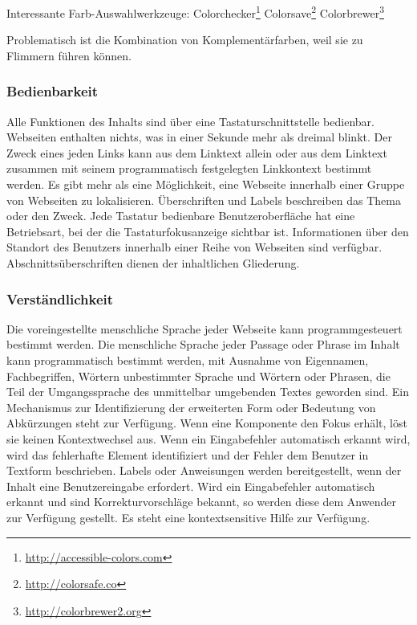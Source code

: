 Interessante Farb-Auswahlwerkzeuge:
Colorchecker\footnote{ \url{http://accessible-colors.com}} 
Colorsave\footnote{ \url{http://colorsafe.co}} 
Colorbrewer\footnote{ \url{http://colorbrewer2.org}} 


Problematisch ist die Kombination von Komplementärfarben, weil sie zu Flimmern führen können.~\cite{HellbuschJanEric2011Bvuu}

\subsubsection*{Bedienbarkeit}
Alle Funktionen des Inhalts sind über eine Tastaturschnittstelle bedienbar.
Webseiten enthalten nichts, was in einer Sekunde mehr als dreimal blinkt.
Der Zweck eines jeden Links kann aus dem Linktext allein oder aus dem Linktext zusammen mit seinem programmatisch festgelegten Linkkontext bestimmt werden. Es gibt mehr als eine Möglichkeit, eine Webseite innerhalb einer Gruppe von Webseiten zu lokalisieren. Überschriften und Labels beschreiben das Thema oder den Zweck. Jede Tastatur bedienbare Benutzeroberfläche hat eine Betriebsart, bei der die Tastaturfokusanzeige sichtbar ist. Informationen über den Standort des Benutzers innerhalb einer Reihe von Webseiten sind verfügbar. Abschnittsüberschriften dienen der inhaltlichen Gliederung. 



\subsubsection*{Verständlichkeit}

Die voreingestellte menschliche Sprache jeder Webseite kann programmgesteuert bestimmt werden. Die menschliche Sprache jeder Passage oder Phrase im Inhalt kann programmatisch bestimmt werden, mit Ausnahme von Eigennamen, Fachbegriffen, Wörtern unbestimmter Sprache und Wörtern oder Phrasen, die Teil der Umgangssprache des unmittelbar umgebenden Textes geworden sind. Ein Mechanismus zur Identifizierung der erweiterten Form oder Bedeutung von Abkürzungen steht zur Verfügung.  Wenn eine Komponente den Fokus erhält, löst sie keinen Kontextwechsel aus. Wenn ein Eingabefehler automatisch erkannt wird, wird das fehlerhafte Element identifiziert und der Fehler dem Benutzer in Textform beschrieben. Labels oder Anweisungen werden bereitgestellt, wenn der Inhalt eine Benutzereingabe erfordert.  Wird ein Eingabefehler automatisch erkannt und sind Korrekturvorschläge bekannt, so werden diese dem Anwender zur Verfügung gestellt.  Es steht eine kontextsensitive Hilfe zur Verfügung.



